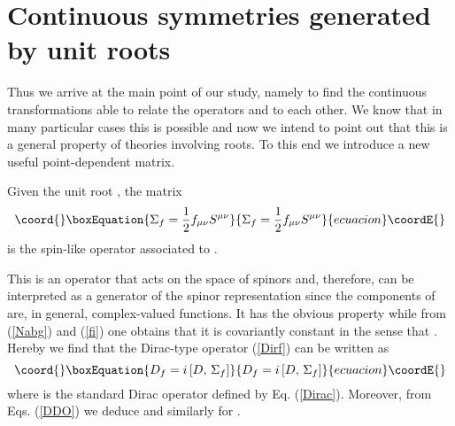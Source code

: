\documentclass[a4paper,12pt]{article}
\begin{document}
\section{Continuous symmetries generated by unit roots} 

Thus we arrive at the main point of our study, namely to find the continuous 
transformations able to relate the operators \coordHE{} and \coordHE{} to each other. 
We know that in many particular cases \cite{CV1, K2, CV} this is possible 
and now we intend to point out that this is a general property of theories 
involving roots. To this end we introduce a new useful point-dependent matrix.    
\begin{defin}
Given the unit root \coordHE{}, the matrix 
\begin{equation}\coord{}\boxEquation{\label{SfS}
\Sigma_{f}=\frac{1}{2}f_{\mu\nu}S^{\mu\nu}
}{\Sigma_{f}=\frac{1}{2}f_{\mu\nu}S^{\mu\nu}
}{ecuacion}\coordE{}\end{equation}
is the spin-like operator associated to \coordHE{}.
\end{defin}
This is an operator that acts on the space of spinors \coordHE{} and, therefore, 
can be interpreted as a generator of the spinor representation 
\coordHE{} since the components of \coordHE{} are, in general, 
complex-valued functions.  It has the obvious property \coordHE{} while from (\ref{Nabg}) and (\ref{fi}) one 
obtains that it is covariantly constant in the sense that
\coordHE{}.   
Hereby we find that the Dirac-type operator (\ref{Dirf}) can be written as
\begin{equation}\coord{}\boxEquation{\label{DDS}
D_f=i\left[D,\, \Sigma_f\right]
}{D_f=i\left[D,\, \Sigma_f\right]
}{ecuacion}\coordE{}\end{equation}
where \coordHE{} is the standard Dirac operator defined by Eq. (\ref{Dirac}).
Moreover, from Eqs. (\ref{DDO}) we deduce 
\coordHE{} 
and similarly for \coordHE{}.
\end{document}
